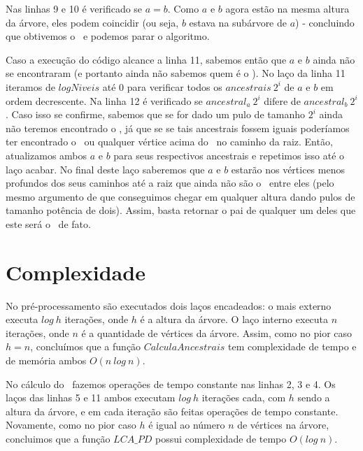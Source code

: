 Nas linhas 9 e 10 é verificado se $a = b$. Como $a$ e $b$ agora estão na mesma altura da árvore, eles podem coincidir (ou seja, $b$ estava na subárvore de $a$) - concluindo que obtivemos o \LCA\ e podemos parar o algoritmo.

Caso a execução do código alcance a linha 11, sabemos então que $a$ e $b$ ainda não se encontraram (e portanto ainda não sabemos quem é o \LCA). No laço da linha 11 iteramos de $logNiveis$ até 0 para verificar todos os $ancestrais\ 2^i$ de $a$ e $b$ em ordem decrescente. Na linha 12 é verificado se $ancestral_a\ 2^i$ difere de $ancestral_b\ 2^i$. Caso isso se confirme, sabemos que se for dado um pulo de tamanho $2^i$ ainda não teremos encontrado o \LCA, já que se se tais ancestrais fossem iguais poderíamos ter encontrado o \LCA\ ou qualquer vértice acima do \LCA\ no caminho da raiz. Então, atualizamos ambos $a$ e $b$ para seus respectivos ancestrais e repetimos isso até o laço acabar. No final deste laço saberemos que $a$ e $b$ estarão nos vértices menos profundos dos seus caminhos até a raiz que ainda não são o \LCA\ entre eles (pelo mesmo argumento de que conseguimos chegar em qualquer altura dando pulos de tamanho potência de dois). Assim, basta retornar o pai de qualquer um deles que este será o \LCA\ de fato.

\vspace{10cm}

\section{Complexidade}

No pré-processamento são executados dois laços encadeados: o mais externo executa $log\ h$ iterações, onde $h$ é a altura da árvore. O laço interno executa $n$ iterações, onde $n$ é a quantidade de vértices da árvore. Assim, como no pior caso $h = n$, concluímos que a função $CalculaAncestrais$ tem complexidade de tempo e de memória ambos $O(n\ log\ n)$.

No cálculo do \LCA\ fazemos operações de tempo constante nas linhas 2, 3 e 4. Os laços das linhas 5 e 11 ambos executam $log\ h$ iterações cada, com $h$ sendo a altura da árvore, e em cada iteração são feitas operações de tempo constante. Novamente, como no pior caso $h$ é igual ao número $n$ de vértices na árvore, concluimos que a função $LCA\_PD$ possui complexidade de tempo $O(log\ n)$.